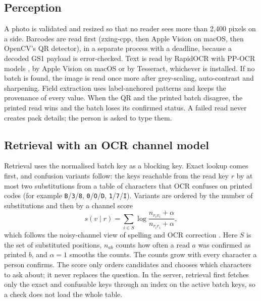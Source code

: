 \subsection{Perception}
A photo is validated and resized so that no reader sees more than 2{,}400 pixels on a side. Barcodes are read first (zxing-cpp, then Apple Vision on macOS, then OpenCV's QR detector), in a separate process with a deadline, because a decoded GS1 payload is error-checked. Text is read by RapidOCR with PP-OCR models \cite{rapidai2021rapidocr,du2020ppocr}, by Apple Vision on macOS or by Tesseract, whichever is installed. If no batch is found, the image is read once more after grey-scaling, auto-contrast and sharpening. Field extraction uses label-anchored patterns and keeps the provenance of every value. When the QR and the printed batch disagree, the printed read wins and the batch loses its confirmed status. A failed read never creates pack details; the person is asked to type them.

\subsection{Retrieval with an OCR channel model}
Retrieval uses the normalised batch key as a blocking key. Exact lookup comes first, and confusion variants follow: the keys reachable from the read key $r$ by at most two substitutions from a table of characters that OCR confuses on printed codes (for example \texttt{B}/\texttt{3}/\texttt{8}, \texttt{0}/\texttt{O}/\texttt{D}, \texttt{1}/\texttt{7}/\texttt{I}). Variants are ordered by the number of substitutions and then by a channel score
\begin{equation}
s(v \mid r) = \sum_{i \in S} \log \frac{n_{r_i v_i} + \alpha}{n_{r_i r_i} + \alpha},
\label{eq:channel}
\end{equation}
which follows the noisy-channel view of spelling and OCR correction \cite{kernighan1990spelling,brill2000improved,kolak2002ocr}. Here $S$ is the set of substituted positions, $n_{ab}$ counts how often a read $a$ was confirmed as printed $b$, and $\alpha = 1$ smooths the counts. The counts grow with every character a person confirms. The score only orders candidates and chooses which characters to ask about; it never replaces the question. In the server, retrieval first fetches only the exact and confusable keys through an index on the active batch keys, so a check does not load the whole table.


